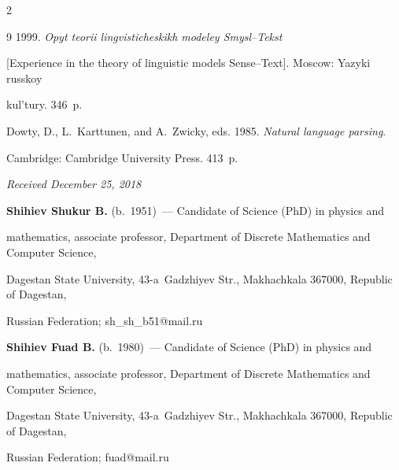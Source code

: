 \begin{multicols}{2}
{{\begin{thebibliography}{9}
 1999. \textit{Opyt teorii lingvisticheskikh modeley Smysl--Tekst} 

[Experience in the theory of linguistic models Sense--Text]. Moscow: Yazyki russkoy 

kul'tury. 346~p.


Dowty, D., L.~Karttunen, and A.~Zwicky, eds. 1985. \textit{Natural language parsing}. 

Cambridge: Cambridge University Press. 413~p.



\end{thebibliography}



 }

 }



\end{multicols}



\vspace*{-6pt}



\hfill{\small\textit{Received December 25, 2018}}









\Contr





\noindent

\textbf{Shihiev Shukur B.} (b.\ 1951)~--- Candidate of Science (PhD) in physics and 

mathematics, associate professor, Department of Discrete Mathematics and Computer Science, 

Dagestan State University, 43-a~Gadzhiyev Str., Makhachkala 367000, Republic of Dagestan, 

Russian Federation; \mbox{sh\_sh\_b51@mail.ru}



\vspace*{6pt}



\noindent

\textbf{Shihiev Fuad B.} (b.\ 1980)~--- Candidate of Science (PhD) in physics and 

mathematics, associate professor, Department of Discrete Mathematics and Computer Science, 

Dagestan State University, 43-a~Gadzhiyev Str., Makhachkala 367000, Republic of Dagestan, 

Russian Federation; \mbox{fuad@mail.ru}



\label{end\stat}



\renewcommand{\bibname}{\protect\rm Литература} 

